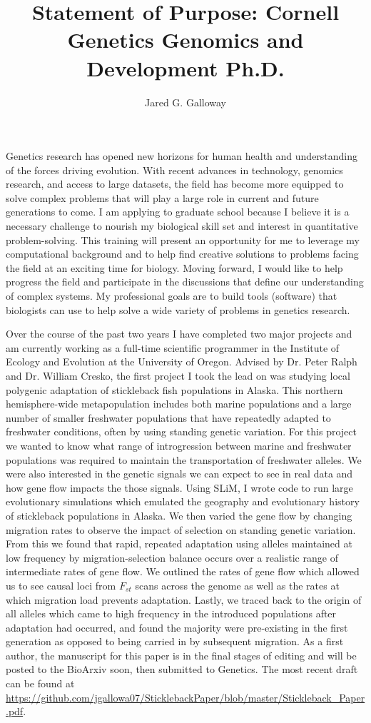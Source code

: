 \documentclass[11pt]{amsart}
\title{Statement of Purpose: Cornell Genetics Genomics and Development Ph.D.}
\author{Jared G. Galloway}
\newcommand{\sepspace}{\vspace*{1em}}		%
\begin{document}
\maketitle

Genetics research has opened new horizons for human health and understanding of the forces driving evolution.
With recent advances in technology, genomics research, and access to large datasets, 
the field has become more equipped to solve complex problems that will play a large role in current and future generations to come.
I am applying to graduate school because I believe it is a necessary challenge to nourish my biological skill set and interest in quantitative problem-solving. 
This training will present an opportunity for me to leverage my computational background and to help find creative solutions to problems facing the field at an exciting time for biology.
Moving forward, I would like to help progress the field and participate in the discussions that define our understanding of complex systems.
My professional goals are to build tools (software) that biologists can use to help solve a wide variety of problems in genetics research.
\sepspace

Over the course of the past two years I have completed two major projects and am currently working as a full-time scientific programmer in the Institute of Ecology and Evolution at the University of Oregon.
Advised by Dr. Peter Ralph and Dr. William Cresko, the first project I took the lead on was studying local polygenic adaptation of stickleback fish populations in Alaska. 
This northern hemisphere-wide metapopulation includes both marine populations and a large number of smaller freshwater populations that have repeatedly adapted to freshwater conditions, often by using standing genetic variation. 
For this project we wanted to know what range of introgression between marine and freshwater populations was required to maintain the transportation of freshwater alleles.
We were also interested in the genetic signals we can expect to see in real data and how gene flow impacts the those signals. 
Using SLiM, I wrote code to run large evolutionary simulations which emulated the geography and evolutionary history of stickleback populations in Alaska.
We then varied the gene flow by changing migration rates to observe the impact of selection on standing genetic variation. 
From this we found that rapid, repeated adaptation using alleles maintained at low frequency by migration-selection balance occurs over a realistic range of intermediate rates of gene flow.
We outlined the rates of gene flow which allowed us to see causal loci from $F_{st}$ scans across the genome as well as the rates at which migration load prevents adaptation.
Lastly, we traced back to the origin of all alleles which came to high frequency in the introduced populations after adaptation had occurred, and found the majority were pre-existing in the first generation as opposed to being carried in by subsequent migration.
As a first author, the manuscript for this paper is in the final stages of editing and will be posted to the BioArxiv soon, then submitted to Genetics. The most recent draft can be found at
\url{https://github.com/jgallowa07/SticklebackPaper/blob/master/Stickleback_Paper.pdf}.
\sepspace
\end{document}
